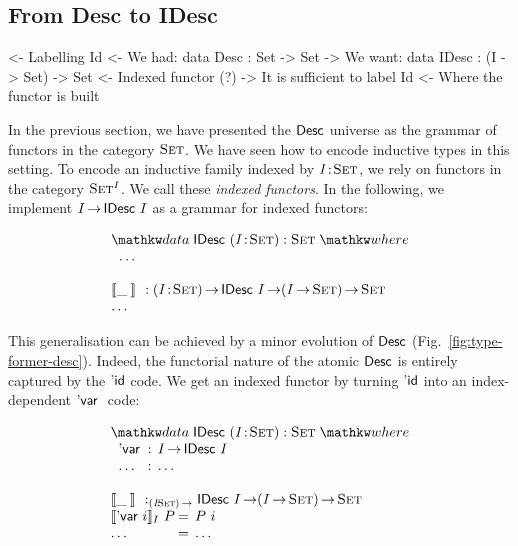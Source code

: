 \subsection{From Desc to IDesc}

\begin{wstructure}
<- Labelling Id
    <- We had: data Desc : Set -> Set
    -> We want: data IDesc : (I -> Set) -> Set
        <- Indexed functor (?)
        -> It is sufficient to label Id
            <- Where the functor is built
\end{wstructure}

In the previous section, we have presented the $\Desc$ universe as the
grammar of functors in the category $\Set$. We have seen how to encode
inductive types in this setting. To encode an inductive family indexed
by $\Bhab{\V{I}}{\Set}$, we rely on functors in the category
$\Set^I$. We call these \emph{indexed functors}. 
In the following, we
implement $I \To \IDesc{I}$ as a grammar for indexed functors:

\[\stk{
\data \IDesc{} (\Bhab{\V{I}}{\Set}) : \Set \where \\
\;\;\ldots \\
\\
\idescop{\_\:}{}{} : \PI{\V{I}}{\Set} \IDesc{I} \To (\V{I} \To \Set) \To \Set    \\
\ldots
}\]

This generalisation can be achieved by a minor evolution of $\Desc$
(Fig.~\ref{fig:type-former-desc}). Indeed, the functorial nature of the
atomic $\Desc$ is entirely captured by the $\DId$ code. We get an indexed
functor by turning $\DId$ into an index-dependent $\DVar$ code:

\[\stk{
\data \IDesc{} (\Bhab{\V{I}}{\Set}) : \Set \where \\
\;\;\begin{array}{@{}l@{\::\:\:}l@{\quad}l}
    \DVar{}         & I \To \IDesc{I}                                   \\
    \ldots          & \ldots
\end{array} \\
\\
\idescop{\_\:}{}{} :_{\PI{\V{I}}{\Set}} \IDesc{I} \To (\V{I} \To \Set) \To \Set        \\
\begin{array}{@{}l@{\:=\:\:}ll}
\idescop{\DVar{i}}{I}{P}      &  P~i                                                 \\
\ldots                        &  \ldots
\end{array}
}\]

